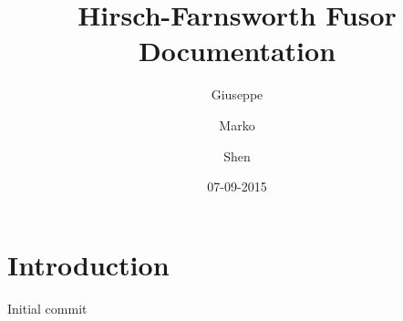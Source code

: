 \documentclass[
	12pt,
	a4paper,
	final,
	onecolumn,
	notitlepage
]{article}
\title{Hirsch-Farnsworth Fusor Documentation}
\date{07-09-2015}
\author{Giuseppe \and Marko \and Shen} %
\begin{document}
\maketitle
\tableofcontents

\section{Introduction}
Initial commit
\end{document}
